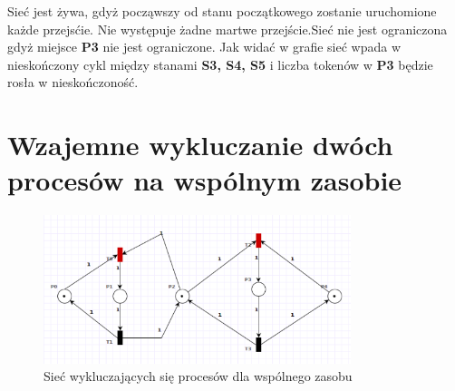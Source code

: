 \documentclass{article}
\begin{document}
Sieć jest żywa, gdyż począwszy od stanu początkowego zostanie uruchomione każde przejsćie.
Nie występuje żadne martwe przejście.Sieć nie jest ograniczona gdyż miejsce \textbf{P3}
nie jest ograniczone. Jak widać w grafie sieć wpada w nieskończony cykl między stanami \textbf{S3, S4, S5}
i liczba tokenów w \textbf{P3} będzie rosła w nieskończoność.

\section{Wzajemne wykluczanie dwóch procesów na wspólnym zasobie}
\begin{figure}[H]
    \centering
    \includegraphics[width=0.8\textwidth, height=0.4\textheight]{zad3.png}
    \caption{Sieć wykluczających się procesów dla wspólnego zasobu}
\end{figure}
\end{document}
